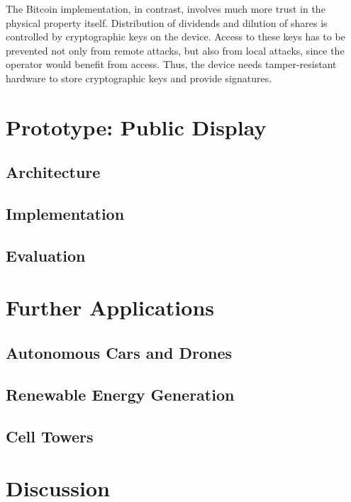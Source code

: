 The Bitcoin implementation, in contrast, involves much more trust in the physical property itself.
Distribution of dividends and dilution of shares is controlled by cryptographic keys on the device. Access to these keys has to be prevented not only from remote attacks, but also from local attacks, since the operator would benefit from access. Thus, the device needs tamper-resistant hardware to store cryptographic keys and provide signatures.
 
\section{Prototype: Public Display}

\subsection{Architecture}

\subsection{Implementation}

\subsection{Evaluation}




\section{Further Applications}

\subsection{Autonomous Cars and Drones}

\subsection{Renewable Energy Generation}

\subsection{Cell Towers}


\section{Discussion}


